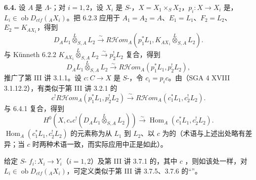 \textbf{6.4.} 设 $A$ 是 $\Lambda$-；对 $i=1,2$，设 $X_i$ 是 $S$-，$X=X_1\times_SX_2$，$p_i:X\to X_i$ 是，$L_i\in\operatorname{ob}D_{ctf}({}_AX_i)$。把 6.2.3 应用于 $A_1=A_2=A$、$E_1=L_1$、$F_2=L_2$、$E_2=K_{AX_1}$，得到
\[D_AL_1\overset L\otimes_{S,A}L_2\xrightarrow\sim R\mathcal H\!om_A(p_1^*L_1,K_{AX_1}\overset L\otimes_{S,A}L_2).\]
与 Künneth  6.2.2 $K_{AX_1}\overset L\otimes_{S,A}L_2\xrightarrow\sim p_2^!L_2$ 复合，得到
\begin{equation}D_AL_1\overset L\otimes_{S,A}L_2\xrightarrow\sim R\mathcal H\!om_A(p_1^*L_1,p_2^!L_2),\tag{6.4.1}\end{equation}
推广了第 III 讲 3.1.1。设 $c:C\to X$ 是 $S$-，令 $c_i=p_ic$。由（SGA 4 XVIII 3.1.12.2），有类似于第 III 讲 3.2.1 的
\begin{equation}c^!R\mathcal H\!om_A(p_1^*L_1,p_2^!L_2)\xrightarrow\sim R\mathcal H\!om_A(c_1^*L_1,c_2^!L_2).\tag{6.4.2}\end{equation}
与 6.4.1 复合，得到
\begin{equation}H^0(X,c_*c^!(D_AL_1\overset L\otimes_{S,A}L_2))\xrightarrow\sim\operatorname{Hom}_A(c_1^*L_1,c_2^!L_2).\tag{6.4.3}\end{equation}
$\operatorname{Hom}_A(c_1^*L_1,c_2^!L_2)$ 的元素称为从 $L_1$ 到 $L_2$、以 $c$ 为的（术语与上述出处略有差异；当 $c$ 时两种术语一致，而实际应用中正是如此）。

给定 $S$- $f_i:X_i\to Y_i$（$i=1,2$）及第 III 讲 3.7.1 的，其中 $c$ ，则如该处一样，对 $L_i\in\operatorname{ob}D_{ctf}({}_AX_i)$，可定义类似于第 III 讲 3.7.5、3.7.6 的“”。


